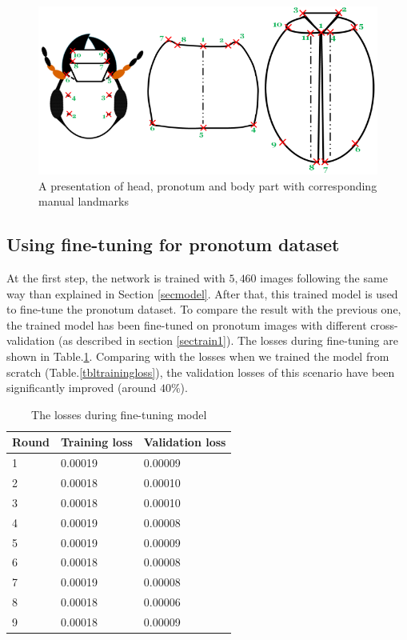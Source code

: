 \documentclass[10pt]{article}
\begin{document}
\begin{figure}[htbp]
        \centering
        \includegraphics[scale=0.3]{images/merge}
    \caption{\small{A presentation of head, pronotum and body part with corresponding manual landmarks}} 
    \label{figshape3parts}
\end{figure}

\subsection{Using fine-tuning for pronotum dataset}
At the first step, the network is trained with $5,460$ images following
the same way than explained in Section \ref{secmodel}. After that, 
this trained model is used to fine-tune the pronotum dataset. To compare the result with
the previous one, the trained model has been fine-tuned on pronotum images with different cross-validation (as described in section \ref{sectrain1}). The losses during fine-tuning are shown in
Table.\ref{tblfinetuningloss}. Comparing with the losses when we
trained the model from scratch (Table.\ref{tbltrainingloss}), the
validation losses of this scenario have been significantly improved (around
$40\%$).
\begin{table}[h!]
	\centering
	\begin{tabular}{l l l}
	Round & Training loss & Validation loss \\ \hline
	1 & 0.00019 & 0.00009  \\ \hline
	2 & 0.00018 & 0.00010 \\ \hline
	3 & 0.00018 & 0.00010 \\ \hline
	4 & 0.00019 & 0.00008 \\ \hline
	5 & 0.00019 & 0.00009 \\ \hline
	6 & 0.00018 & 0.00008 \\ \hline
	7 & 0.00019 & 0.00008 \\ \hline
	8 & 0.00018 & 0.00006 \\ \hline
	9 & 0.00018 & 0.00009 \\ \hline
	\end{tabular}
	\caption{\small{The losses during fine-tuning model}}
	\label{tblfinetuningloss}
	
\end{table}
\end{document}
